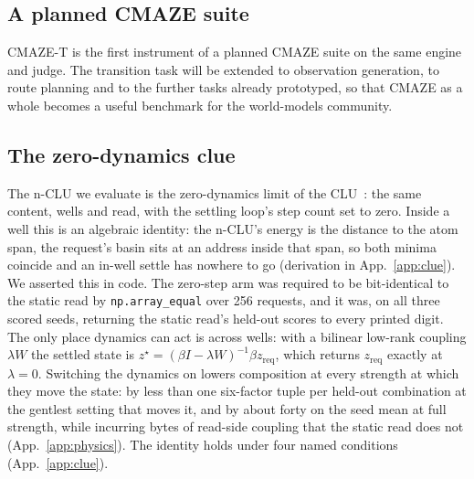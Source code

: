 \documentclass{article} %
\begin{document}
\subsection{A planned CMAZE suite}

CMAZE-T is the first instrument of a planned CMAZE suite on the same
engine and judge. The transition task will be extended to observation generation, to route planning
and to the further tasks already prototyped, so that CMAZE as a whole becomes a useful benchmark for
the world-models community.

\subsection{The zero-dynamics clue}
\label{sec:clue}

The n-CLU we evaluate is the zero-dynamics limit of the CLU~\citep{jawahar2026chlu}: the same content, wells and read, with the settling loop's step count set to zero. Inside a well this is an
algebraic identity: the n-CLU's energy is the distance to the atom span, the request's basin sits
at an address inside that span, so both minima coincide and an in-well settle has nowhere to go
(derivation in App.~\ref{app:clue}). We asserted this in code. The zero-step arm was required to be bit-identical to
the static read by \texttt{np.array\_equal} over 256 requests, and it was, on all three scored
seeds, returning the static read's held-out scores to every printed digit. %
The only place dynamics can act is across wells: with a bilinear low-rank coupling $\lambda W$
the settled state is $z^\star=(\beta I-\lambda W)^{-1}\beta z_{\text{req}}$, which returns
$z_{\text{req}}$ exactly at $\lambda=0$. Switching the dynamics on lowers composition at every
strength at which they move the state: by less than one six-factor tuple per
held-out combination at the gentlest setting that moves it, and by about forty on the seed mean at full strength, while incurring
bytes of read-side coupling that the static read does not (App.~\ref{app:physics}). %
The identity holds under four named conditions (App.~\ref{app:clue}).
\end{document}
